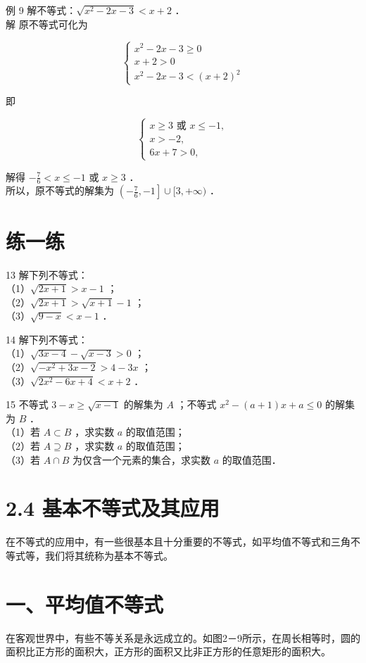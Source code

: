 \documentclass[10pt]{article}
\begin{document}
例 9 解不等式：\(\sqrt{x^{2}-2 x-3}<x+2\) ．\\
解 原不等式可化为

\[
\left\{\begin{array}{l}
x^{2}-2 x-3 \geqslant 0 \\
x+2>0 \\
x^{2}-2 x-3<(x+2)^{2}
\end{array}\right.
\]

即

\[
\left\{\begin{array}{l}
x \geqslant 3 \text { 或 } x \leqslant-1, \\
x>-2, \\
6 x+7>0,
\end{array}\right.
\]

解得 \(-\frac{7}{6}<x \leqslant-1\) 或 \(x \geqslant 3\) ．\\
所以，原不等式的解集为 \(\left(-\frac{7}{6},-1\right] \cup[3,+\infty)\) ．

\section*{练一练}
13 解下列不等式：\\
（1）\(\sqrt{2 x+1}>x-1\) ；\\
（2）\(\sqrt{2 x+1}>\sqrt{x+1}-1\) ；\\
（3）\(\sqrt{9-x}<x-1\) ．

14 解下列不等式：\\
（1）\(\sqrt{3 x-4}-\sqrt{x-3}>0\) ；\\
（2）\(\sqrt{-x^{2}+3 x-2}>4-3 x\) ；\\
（3）\(\sqrt{2 x^{2}-6 x+4}<x+2\) ．

15 不等式 \(3-x \geqslant \sqrt{x-1}\) 的解集为 \(A\) ；不等式 \(x^{2}-(a+1) x+a \leqslant 0\) 的解集为 \(B\) ．\\
（1）若 \(A \subset B\) ，求实数 \(a\) 的取值范围；\\
（2）若 \(A \supseteq B\) ，求实数 \(a\) 的取值范围；\\
（3）若 \(A \cap B\) 为仅含一个元素的集合，求实数 \(a\) 的取值范围．

\section*{2.4 基本不等式及其应用}
在不等式的应用中，有一些很基本且十分重要的不等式，如平均值不等式和三角不等式等，我们将其统称为基本不等式。

\section*{一、平均值不等式}
在客观世界中，有些不等关系是永远成立的。如图2－9所示，在周长相等时，圆的面积比正方形的面积大，正方形的面积又比非正方形的任意矩形的面积大。
\end{document}

